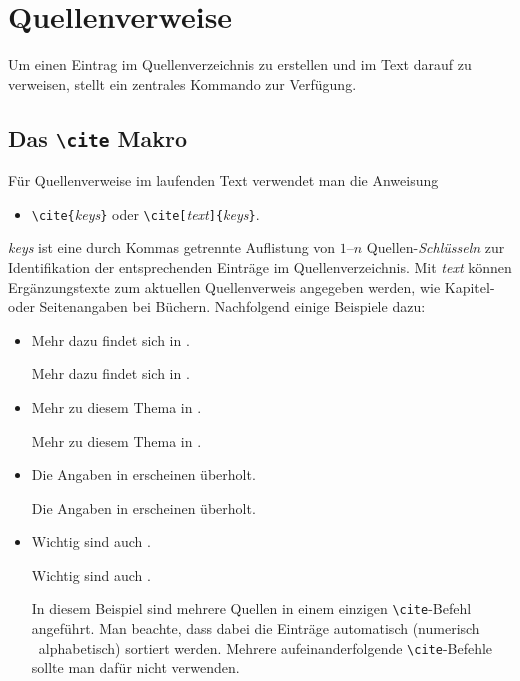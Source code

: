 \section{Quellenverweise}

Um einen Eintrag im Quellenverzeichnis zu erstellen und im Text darauf zu verweisen, stellt \latex ein zentrales Kommando zur Verfügung.

\subsection{Das \texttt{\textbackslash cite} Makro}

Für Quellenverweise im laufenden Text verwendet man die Anweisung
\begin{itemize}
\item[] \verb!\cite{!\textit{keys}\verb!}! 
				\quad oder \quad
        \verb!\cite[!\textit{text}\verb!]{!\textit{keys}\verb!}!.
\end{itemize}

\noindent%
\textit{keys} ist eine durch Kommas getrennte Auflistung von $1$--$n$ Quellen-\emph{Schlüsseln}
zur Identifikation der entsprechenden Einträge im Quellenverzeichnis.
Mit \textit{text} können Ergänzungstexte zum aktuellen Quellenverweis angegeben
werden, wie \zB Kapitel- oder Seitenangaben bei Büchern.
Nachfolgend einige Beispiele dazu:
%
\begin{itemize}
\item
Mehr dazu findet sich in \cite{Kopka2003}. %
\begin{LaTeXCode}[numbers=none]
Mehr dazu findet sich in \cite{Kopka2003}.
\end{LaTeXCode}

\item
Mehr zu diesem Thema in \cite[Kap.~3]{Kopka2003}.
\begin{LaTeXCode}[numbers=none]
Mehr zu diesem Thema in \cite[Kap.~3]{Kopka2003}.
\end{LaTeXCode}

\item
Die Angaben in \cite[S.\ 274--277]{BurgeBurger1999} erscheinen überholt.
\begin{LaTeXCode}[numbers=none]
Die Angaben in \cite[S.\ 274--277]{BurgeBurger1999} erscheinen überholt.
\end{LaTeXCode}

\item
Wichtig sind auch \cite{BurgeBurger1999,Patashnik1988,Feder2006,Duden1997}.
\begin{LaTeXCode}[numbers=none]
Wichtig sind auch \cite{BurgeBurger1999,Patashnik1988,Feder2006,Duden1997}.
\end{LaTeXCode}
In diesem Beispiel sind mehrere Quellen in einem einzigen 
\texttt{\textbackslash cite}-Befehl angeführt. 
Man beachte, dass dabei die Einträge automatisch (numerisch \bzw\ 
alphabetisch) sortiert werden.
Mehrere aufeinanderfolgende \texttt{\textbackslash cite}-Befehle sollte man 
dafür nicht verwenden.
\end{itemize}


